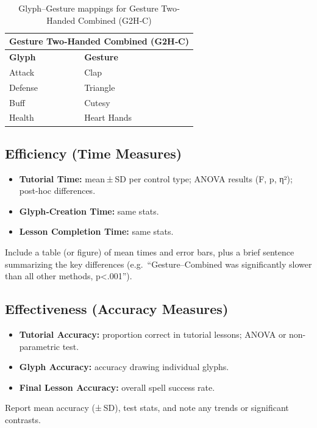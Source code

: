 \documentclass[acmlarge]{acmart}
\begin{document}
\begin{table}[ht]
  \centering
  \caption{Glyph–Gesture mappings for Gesture Two‐Handed Combined (G2H‐C)}
  \label{tab:G2HC-mappings}
  \begin{tabular}{@{}ll@{}}
    \toprule
    \multicolumn{2}{c}{\textbf{Gesture Two‐Handed Combined (G2H‐C)}}\\
    \midrule
    \textbf{Glyph} & \textbf{Gesture} \\
    \midrule
    Attack   & Clap          \\
    Defense  & Triangle      \\
    Buff     & Cutesy        \\
    Health   & Heart Hands   \\
    \bottomrule
  \end{tabular}
\end{table}



\subsection{Efficiency (Time Measures)}
\begin{itemize}
  \item \textbf{Tutorial Time:} mean ± SD per control type; ANOVA results (F, p, η²); post-hoc differences.
  \item \textbf{Glyph‐Creation Time:} same stats.
  \item \textbf{Lesson Completion Time:} same stats.
\end{itemize}
Include a table (or figure) of mean times and error bars, plus a brief sentence summarizing the key differences (e.g.\ “Gesture–Combined was significantly slower than all other methods, p<.001”).

\subsection{Effectiveness (Accuracy Measures)}
\begin{itemize}
  \item \textbf{Tutorial Accuracy:} proportion correct in tutorial lessons; ANOVA or non-parametric test.
  \item \textbf{Glyph Accuracy:} accuracy drawing individual glyphs.
  \item \textbf{Final Lesson Accuracy:} overall spell success rate.
\end{itemize}
Report mean accuracy (± SD), test stats, and note any trends or significant contrasts.
\end{document}
